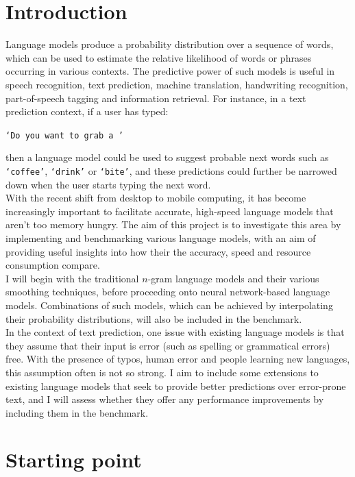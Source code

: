 \documentclass[a4paper, 12pt]{article}
\newcommand{\ttt}[1]{\texttt{#1}}
\begin{document}
\section*{Introduction}
Language models produce a probability distribution over a sequence of words, which can be used to estimate the relative likelihood of words or phrases occurring in various contexts. The predictive power of such models is useful in speech recognition, text prediction, machine translation, handwriting recognition, part-of-speech tagging and information retrieval. For instance, in a text prediction context, if a user has typed:

\begin{center}
	\ttt{`Do you want to grab a '}
\end{center}

then a language model could be used to suggest probable next words such as \ttt{`coffee'}, \ttt{`drink'} or \ttt{`bite'}, and these predictions could further be narrowed down when the user starts typing the next word. \\

With the recent shift from desktop to mobile computing, it has become increasingly important to facilitate accurate, high-speed language models that aren't too memory hungry. The aim of this project is to investigate this area by implementing and benchmarking various language models, with an aim of providing useful insights into how their the accuracy, speed and resource consumption compare. \\

I will begin with the traditional $n$-gram language models and their various smoothing techniques, before proceeding onto neural network-based language models. Combinations of such models, which can be achieved by interpolating their probability distributions, will also be included in the benchmark. \\

In the context of text prediction, one issue with existing language models is that they assume that their input is error (such as spelling or grammatical errors) free. With the presence of typos, human error and people learning new languages, this assumption often is not so strong. I aim to include some extensions to existing language models that seek to provide better predictions over error-prone text, and I will assess whether they offer any performance improvements by including them in the benchmark.

\section*{Starting point}
\end{document}
